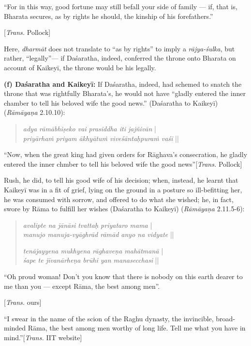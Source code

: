 \begin{myquote}
 “For in this way, good fortune may still befall your side of family --- if, that is, Bharata secures, as by rights he should, the kinship of his forefathers.” 

\hfill [{\sl Trans.} Pollock]
\end{myquote}

Here, {\sl dharmāt} does not translate to “as by rights” to imply a {\sl rājya-śulka}, but rather, “legally”--- if Daśaratha, indeed, conferred the throne onto Bharata on account of Kaikeyī, the throne would be his legally. 

\smallskip
\noindent
\textbf{(f) Daśaratha and Kaikeyī:} If Daśaratha, indeed, had schemed to snatch the throne that was rightfully Bharata’s, he would not have “gladly entered the inner chamber to tell his beloved wife the good news.” (Daśaratha to Kaikeyī) ({\sl Rāmāyaṇa} 2.10.10):
\begin{quote}
{{\sl adya rāmābhiṣeko vai prasiddha iti jajñivān}}\label{verse15} |\\
{\sl priyārhaṁ priyam ākhyātuṁ viveśāntaḥpuraṁ vaśī} || 
\end{quote}

\begin{myquote}
“Now, when the great king had given orders for Rāghava’s consecration, he gladly entered the inner chmber to tell his beloved wife the good news”\hfill [{\sl Trans.} Pollock]
\end{myquote}

Rush, he did, to tell his good wife of his decision; when, instead, he learnt that Kaikeyī was in a fit of grief, lying on the ground in a posture so ill-befitting her, he was consumed with sorrow, and offered to do what she wished; he, in fact, swore by Rāma to fulfill her wishes (Daśaratha to Kaikeyī) ({\sl Rāmāyaṇa} 2.11.5-6): 
\begin{quote}
{{\sl avalipte na jānāsi tvattaḥ priyataro mama}}\label{verse16} |\\
{\sl manujo manuja-vyāghrād rāmād anyo na vidyate} || 

{\sl tenājayyena mukhyena rāghaveṇa mahātmanā}\label{verse17} |\\
{\sl śape te jīvanārheṇa brūhi yan manasecchasi} ||
\end{quote}

\begin{myquote}
“Oh proud woman! Don't you know that there is nobody on this earth dearer to me than you --- except Rāma, the best among men”.

\hfill [{\sl Trans.} ours]


“I swear in the name of the scion of the Raghu dynasty, the invincible, broad-minded Rāma, the best among men worthy of long life. Tell me what you have in mind.”\hfill [{\sl Trans.} IIT website]
\end{myquote}

